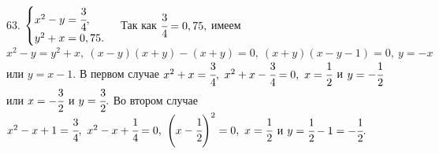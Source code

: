 63. $\begin{cases}x^2-y=\cfrac{3}{4},\\ y^2+x=0,75.\end{cases}$ Так как $\cfrac{3}{4}=0,75,$ имеем $x^2-y=y^2+x,\ (x-y)(x+y)-(x+y)=0,\ (x+y)(x-y-1)=0,\ y=-x$ или $y=x-1.$ В первом случае $x^2+x=\cfrac{3}{4},\ x^2+x-\cfrac{3}{4}=0,\ x=\cfrac{1}{2}$ и $y=-\cfrac{1}{2}$ или $x=-\cfrac{3}{2}$ и $y=\cfrac{3}{2}.$ Во втором случае $x^2-x+1=\cfrac{3}{4},\ x^2-x+\cfrac{1}{4}=0,\ \left(x-\cfrac{1}{2}\right)^2=0,\ x=\cfrac{1}{2}$ и $y=\cfrac{1}{2}-1=-\cfrac{1}{2}.$\\
